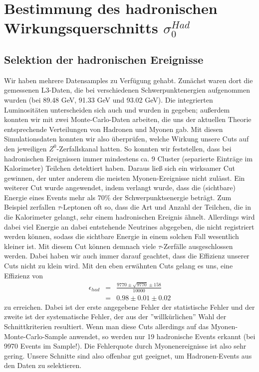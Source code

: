 \section{Bestimmung des hadronischen Wirkungsquerschnitts $\sigma_0^{Had}$}
\subsection{Selektion der hadronischen Ereignisse}
Wir haben mehrere Datensamples zu Verfügung gehabt. Zunächst waren dort die gemessenen L3-Daten, die bei verschiedenen Schwerpunktenergien aufgenommen wurden (bei 89.48 GeV, 91.33 GeV und 93.02 GeV). Die integrierten Luminositäten unterscheiden sich auch und wurden in \cite[S.9]{script} gegeben; außerdem konnten wir mit zwei Monte-Carlo-Daten arbeiten, die uns der aktuellen Theorie entsprechende Verteilungen von Hadronen und Myonen gab. Mit diesen Simulationsdaten konnten wir also überprüfen, welche Wirkung unsere Cuts auf den jeweiligen $Z^0$-Zerfallskanal hatten. So konnten wir feststellen, dass bei hadronischen Ereignissen immer mindestens ca. 9 Cluster (separierte Einträge im Kalorimeter) Teilchen detektiert haben. Daraus ließ sich ein wirksamer Cut gewinnen, der unter anderem die meisten Myonen-Ereignisse nicht zulässt. Ein weiterer Cut wurde angewendet, indem verlangt wurde, dass die (sichtbare) Energie eines Events mehr als $70\%$ der Schwerpunktsenergie beträgt. Zum Beispiel zerfallen $\tau$-Leptonen oft so, dass die Art und Anzahl der Teilchen, die in die Kalorimeter gelangt, sehr einem hadronischen Ereignis ähnelt. Allerdings wird dabei viel Energie an dabei entstehende Neutrines abgegeben, die nicht registriert werden können, sodass die sichtbare Energie in einem solchen Fall wesentlich kleiner ist. Mit diesem Cut können demnach viele $\tau$-Zerfälle ausgeschlossen werden. Dabei haben wir auch immer darauf geachtet, dass die Effizienz unserer Cuts nicht zu klein wird. Mit den eben erwähnten Cuts gelang es uns, eine Effizienz von
\begin{eqnarray}
\epsilon_{had} &=& \frac{9770 \pm \sqrt{9770} \pm 158}{10000}\\
&=& 0.98 \pm 0.01 \pm 0.02
\end{eqnarray}
zu erreichen. Dabei ist der erste angegebene Fehler der statistische Fehler und der zweite ist der systematische Fehler, der aus der ''willkürlichen'' Wahl der Schnittkriterien resultiert. Wenn man diese Cuts allerdings auf das Myonen-Monte-Carlo-Sample anwendet, so werden nur 19 hadronische Events erkannt (bei 9970 Events im Sample!). Die Fehlerquote durch Myonenereignisse ist also sehr gering. Unsere Schnitte sind also offenbar gut geeignet, um Hadronen-Events aus den Daten zu selektieren.

